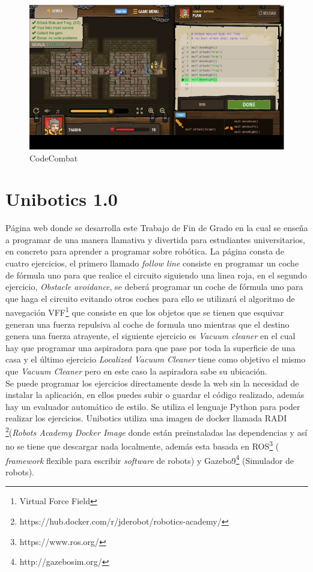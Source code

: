 \begin{figure}[H]
    \centering
    \includegraphics[width=15cm, keepaspectratio]{img/Codecombat.jpg}
    \caption{CodeCombat}
    \label{fig:codecombat}
\end{figure}

\section{Unibotics 1.0}

Página web donde se desarrolla este Trabajo de Fin  de Grado en la cual se enseña a programar de una manera llamativa y divertida para estudiantes universitarios, en concreto para aprender a programar sobre robótica. La página consta de cuatro ejercicios, el primero llamado \textit{follow line} consiste en programar un coche de fórmula uno para que realice el circuito siguiendo una linea roja, en el segundo ejercicio, \textit{Obstacle avoidance}, se deberá programar un coche de fórmula uno para que haga el circuito evitando otros coches para ello se utilizará el algoritmo de navegación VFF\footnote{Virtual Force Field} que consiste en que los objetos que se tienen que esquivar generan una fuerza repulsiva al coche de formula uno mientras que el destino genera una fuerza atrayente, el siguiente ejercicio es \textit{Vacuum cleaner} en el cual hay que programar una aspiradora para que pase por toda la superficie de una casa y el último ejercicio \textit{Localized Vacuum Cleaner} tiene como objetivo el mismo que \textit{Vacuum Cleaner} pero en este caso la aspiradora sabe su ubicación.\\

\newpage
Se puede programar los ejercicios directamente desde la web sin la necesidad de instalar la aplicación, en ellos puedes subir o guardar el código realizado, además hay un evaluador automático de estilo. Se utiliza el lenguaje Python para poder realizar los ejercicios. Unibotics utiliza una imagen de docker llamada RADI \footnote{https://hub.docker.com/r/jderobot/robotics-academy/}(\textit{Robots Academy Docker Image} donde están preinstaladas las dependencias y así no se tiene que descargar nada localmente, además esta basada en ROS\footnote{https://www.ros.org/} ( \textit{framework} flexible para escribir \textit{software} de robots) y Gazebo9\footnote{http://gazebosim.org/} (Simulador de robots).\cite{robotics}\\

